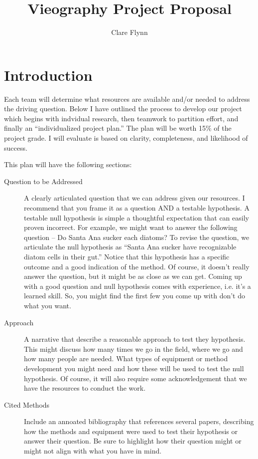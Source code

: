 \documentclass{tufte-handout}
\title{Vieography Project Proposal}
\author{Clare Flynn}
\begin{document}



\maketitle

\section{Introduction}

Each team will determine what resources are available and/or needed to address the driving question. Below I have outlined the process to develop our project which begins with indvidual research, then teamwork to partition effort, and finally an ``individualized project plan.'' The plan will be worth 15\% of the project grade. I will evaluate is based on clarity, completeness, and likelihood of success. 

This plan will have the following sections: 

\begin{description}
  \item[Question to be Addressed] A clearly articulated question that we can address given our resources. I recommend that you frame it as a question AND a testable hypothesis. A testable null hypothesis is simple a thoughtful expectation that can easily proven incorrect. For example, we might want to answer the following question -- Do Santa Ana sucker each diatoms?  To revise the question, we articulate the null hypothesis as ``Santa Ana sucker have recognizable diatom cells in their gut.'' Notice that this hypothesis has a specific outcome and a good indication of the method. Of course, it doesn't really answer the question, but it might be as close as we can get. Coming up with a good question and null hypothesis comes with experience, i.e. it's a learned skill. So, you might find the first few you come up with don't do what you want.   
  \item[Approach] A narrative that describe a reasonable approach to test they hypothesis. This might discuss how many times we go in the field, where we go and how many people are needed. What types of equipment or method development you might need and how these will be used to test the null hypothesis. Of course, it will also require some acknowledgement that we have the resources to conduct the work. 
  \item[Cited Methods] Include an annoated bibliography that references several papers, describing how the methods and equipment were used to test their hypothesis or answer their question. Be sure to highlight how their question might or might not align with what you have in mind.
\end{description}
\end{document}
